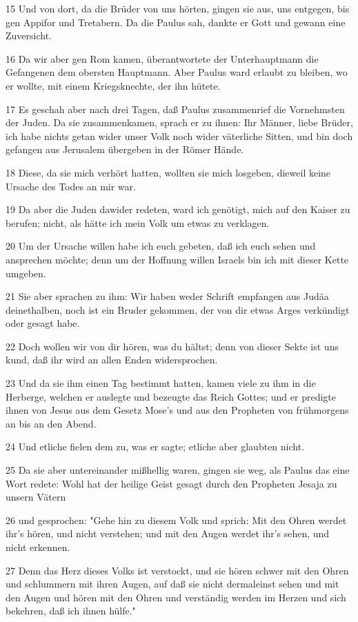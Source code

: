 \par 15 Und von dort, da die Brüder von uns hörten, gingen sie aus, uns entgegen, bis gen Appifor und Tretabern. Da die Paulus sah, dankte er Gott und gewann eine Zuversicht.
\par 16 Da wir aber gen Rom kamen, überantwortete der Unterhauptmann die Gefangenen dem obersten Hauptmann. Aber Paulus ward erlaubt zu bleiben, wo er wollte, mit einem Kriegsknechte, der ihn hütete.
\par 17 Es geschah aber nach drei Tagen, daß Paulus zusammenrief die Vornehmsten der Juden. Da sie zusammenkamen, sprach er zu ihnen: Ihr Männer, liebe Brüder, ich habe nichts getan wider unser Volk noch wider väterliche Sitten, und bin doch gefangen aus Jerusalem übergeben in der Römer Hände.
\par 18 Diese, da sie mich verhört hatten, wollten sie mich losgeben, dieweil keine Ursache des Todes an mir war.
\par 19 Da aber die Juden dawider redeten, ward ich genötigt, mich auf den Kaiser zu berufen; nicht, als hätte ich mein Volk um etwas zu verklagen.
\par 20 Um der Ursache willen habe ich euch gebeten, daß ich euch sehen und ansprechen möchte; denn um der Hoffnung willen Israels bin ich mit dieser Kette umgeben.
\par 21 Sie aber sprachen zu ihm: Wir haben weder Schrift empfangen aus Judäa deinethalben, noch ist ein Bruder gekommen, der von dir etwas Arges verkündigt oder gesagt habe.
\par 22 Doch wollen wir von dir hören, was du hältst; denn von dieser Sekte ist uns kund, daß ihr wird an allen Enden widersprochen.
\par 23 Und da sie ihm einen Tag bestimmt hatten, kamen viele zu ihm in die Herberge, welchen er auslegte und bezeugte das Reich Gottes; und er predigte ihnen von Jesus aus dem Gesetz Mose's und aus den Propheten von frühmorgens an bis an den Abend.
\par 24 Und etliche fielen dem zu, was er sagte; etliche aber glaubten nicht.
\par 25 Da sie aber untereinander mißhellig waren, gingen sie weg, als Paulus das eine Wort redete: Wohl hat der heilige Geist gesagt durch den Propheten Jesaja zu unsern Vätern
\par 26 und gesprochen: "Gehe hin zu diesem Volk und sprich: Mit den Ohren werdet ihr's hören, und nicht verstehen; und mit den Augen werdet ihr's sehen, und nicht erkennen.
\par 27 Denn das Herz dieses Volks ist verstockt, und sie hören schwer mit den Ohren und schlummern mit ihren Augen, auf daß sie nicht dermaleinst sehen und mit den Augen und hören mit den Ohren und verständig werden im Herzen und sich bekehren, daß ich ihnen hülfe."
